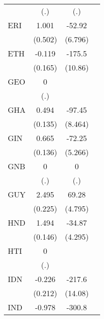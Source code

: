 \begin{table}[htbp]
\begin{tabular}{l*{3}{c}}
                &      (.)         &      (.)         &                  \\
\addlinespace
ERI             &    1.001\sym{*}  &   -52.92\sym{***}&                  \\
                &  (0.502)         &  (6.796)         &                  \\
\addlinespace
ETH             &   -0.119         &   -175.5\sym{***}&                  \\
                &  (0.165)         &  (10.86)         &                  \\
\addlinespace
GEO             &        0         &                  &                  \\
                &      (.)         &                  &                  \\
\addlinespace
GHA             &    0.494\sym{***}&   -97.45\sym{***}&                  \\
                &  (0.135)         &  (8.464)         &                  \\
\addlinespace
GIN             &    0.665\sym{***}&   -72.25\sym{***}&                  \\
                &  (0.136)         &  (5.266)         &                  \\
\addlinespace
GNB             &        0         &        0         &                  \\
                &      (.)         &      (.)         &                  \\
\addlinespace
GUY             &    2.495\sym{***}&    69.28\sym{***}&                  \\
                &  (0.225)         &  (4.795)         &                  \\
\addlinespace
HND             &    1.494\sym{***}&   -34.87\sym{***}&                  \\
                &  (0.146)         &  (4.295)         &                  \\
\addlinespace
HTI             &        0         &                  &                  \\
                &      (.)         &                  &                  \\
\addlinespace
IDN             &   -0.226         &   -217.6\sym{***}&                  \\
                &  (0.212)         &  (14.08)         &                  \\
\addlinespace
IND             &   -0.978\sym{***}&   -300.8\sym{***}&                  \\

\end{tabular}
\end{table}
